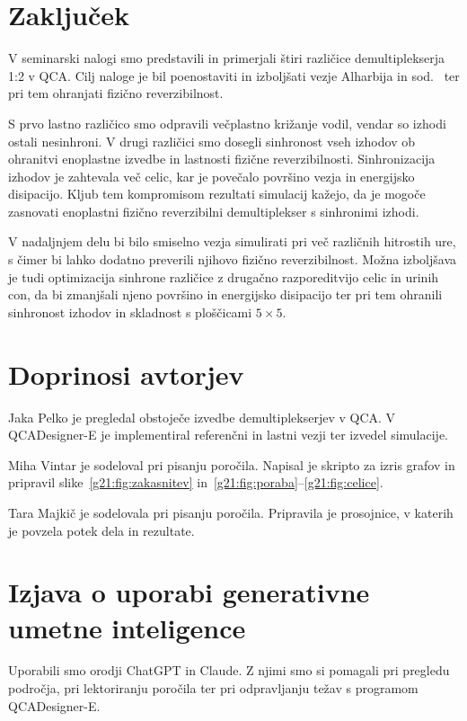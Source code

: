 \documentclass[graybox, envcountchap]{svmult}
\begin{document}
\section{Zaključek}
\label{g21:sec:zakljucek}

V seminarski nalogi smo predstavili in primerjali štiri različice demultiplekserja 1:2 v QCA. Cilj naloge je bil poenostaviti in izboljšati vezje Alharbija in sod.~\cite{alharbi2022} ter pri tem ohranjati fizično reverzibilnost. 

S prvo lastno različico smo odpravili večplastno križanje vodil, vendar so izhodi ostali nesinhroni. V drugi različici smo dosegli sinhronost vseh izhodov ob ohranitvi enoplastne izvedbe in lastnosti fizične reverzibilnosti. Sinhronizacija izhodov je zahtevala več celic, kar je povečalo površino vezja in energijsko disipacijo. Kljub tem kompromisom rezultati simulacij kažejo, da je mogoče zasnovati enoplastni fizično reverzibilni demultiplekser s sinhronimi izhodi. 

V nadaljnjem delu bi bilo smiselno vezja simulirati pri več različnih hitrostih ure, s čimer bi lahko dodatno preverili njihovo fizično reverzibilnost. Možna izboljšava je tudi optimizacija sinhrone različice z drugačno razporeditvijo celic in urinih con, da bi zmanjšali njeno površino in energijsko disipacijo ter pri tem ohranili sinhronost izhodov in skladnost s ploščicami $5\times5$.

\section*{Doprinosi avtorjev}

Jaka Pelko je pregledal obstoječe izvedbe demultiplekserjev v QCA. V QCADesigner-E je implementiral referenčni in lastni vezji ter izvedel simulacije.

Miha Vintar je sodeloval pri pisanju poročila. Napisal je skripto za izris grafov in pripravil slike~\ref{g21:fig:zakasnitev} in~\ref{g21:fig:poraba}--\ref{g21:fig:celice}.

Tara Majkič je sodelovala pri pisanju poročila. Pripravila je prosojnice, v katerih je povzela potek dela in rezultate.

\section*{Izjava o uporabi generativne umetne inteligence}

Uporabili smo orodji ChatGPT in Claude. Z njimi smo si pomagali pri pregledu področja, pri lektoriranju poročila ter pri odpravljanju težav s programom QCADesigner-E.

\backmatter

\end{document}
